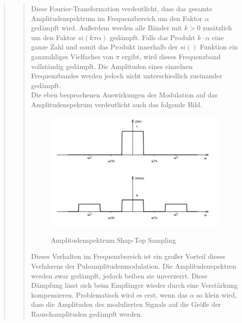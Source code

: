 \begin{quote}
\begin{quote}
        Diese Fourier-Transformation verdeutlicht, dass das gesamte Amplitudenspektrum im Frequenzbereich um den Faktor
        $\alpha$ gedämpft wird. Außerdem werden alle Bänder mit $k > 0$
        zusätzlich um den Faktor $si(k \pi \alpha)$ gedämpft. Falls das Produkt $k \cdot \alpha$ eine ganze Zahl und somit 
        das Produkt innerhalb der $si()$ Funktion
        ein ganzzahliges Vielfaches von $\pi$ ergibt, wird dieses Frequenzband
        vollständig gedämpft. Die Amplituden eines einzelnen Frequenzbandes werden jedoch nicht unterschiedlich zueinander gedämpft.\\
        
        Die eben besprochenen Auswirkungen der Modulation auf das Amplitudenspekrum verdeutlicht auch das folgende Bild.
        
        \begin{figure}[H]
        \centering
            \includegraphics[scale=0.7, trim = 0cm 0cm 0cm 0cm, clip]{./Bilder/AmplitudenspektrumShap_Top}
                \caption{Amplitudenspektrum Shap-Top Sampling}
                \cite{AmplitudenspektrumShap_Top}
        \end{figure}
        
        Dieses Verhalten im Frequenzbereich ist ein großer Vorteil dieses Verfahrens der Pulsamplitudenmodulation. Die
        Amplitudenspektren werden zwar gedämpft, jedoch beiben sie unverzerrt.
        Diese Dämpfung lässt sich beim Empfänger wieder durch eine
        Verstärkung kompensieren. Problematisch wird es erst, wenn das $\alpha$ so klein wird, 
        dass die Amplituden des modulierten Signals auf die Größe der Rauschamplituden gedämpft werden.\vspace{1em}
        

\end{quote}
\end{quote}
